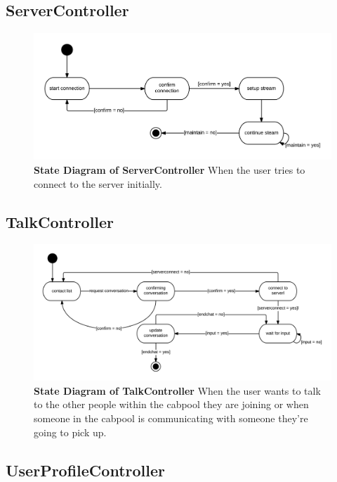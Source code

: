\documentclass[]{article}
\begin{document}
\subsection{ServerController}

\begin{figure}[H]
\label{SrvCState}
	\centering
	\includegraphics[width=1\textwidth]{ServerController.png}
	\caption{\textbf{State Diagram of ServerController} When the user tries to connect to the server initially.}
\end{figure}

\subsection{TalkController}

\begin{figure}[H]
\label{TCState}
	\centering
	\includegraphics[width=1\textwidth]{TalkController.png}
	\caption{\textbf{State Diagram of TalkController} When the user wants to talk to the other people within the cabpool they are joining or when someone in the cabpool is communicating with someone they're going to pick up.}
\end{figure}

\subsection{UserProfileController}
\end{document}
